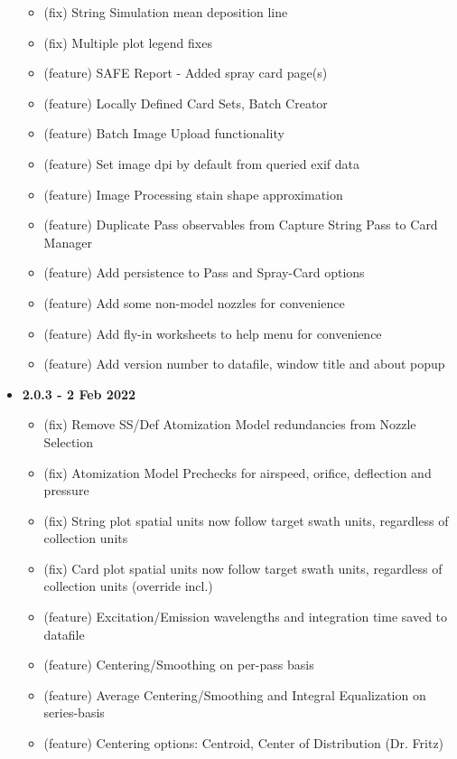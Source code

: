 \documentclass[10pt,letterpaper,titlepage]{article}
\begin{document}
\begin{itemize}
\begin{itemize}
            \item (fix) String Simulation mean deposition line
            \item (fix) Multiple plot legend fixes
            \item (feature) SAFE Report - Added spray card page(s)
            \item (feature) Locally Defined Card Sets, Batch Creator
            \item (feature) Batch Image Upload functionality
            \item (feature) Set image dpi by default from queried exif data
            \item (feature) Image Processing stain shape approximation
            \item (feature) Duplicate Pass observables from Capture String Pass to Card Manager
            \item (feature) Add persistence to Pass and Spray-Card options
            \item (feature) Add some non-model nozzles for convenience
            \item (feature) Add fly-in worksheets to help menu for convenience
            \item (feature) Add version number to datafile, window title and about popup
        \end{itemize}
        \item \textbf{2.0.3 - 2 Feb 2022}
        \begin{itemize}
            \item (fix) Remove SS/Def Atomization Model redundancies from Nozzle Selection
            \item (fix) Atomization Model Prechecks for airspeed, orifice, deflection and pressure
            \item (fix) String plot spatial units now follow target swath units, regardless of collection units
            \item (fix) Card plot spatial units now follow target swath units, regardless of collection units (override incl.)
            \item (feature) Excitation/Emission wavelengths and integration time saved to datafile
            \item (feature) Centering/Smoothing on per-pass basis
            \item (feature) Average Centering/Smoothing and Integral Equalization on series-basis
            \item (feature) Centering options: Centroid, Center of Distribution (Dr. Fritz)

\end{itemize}
\end{itemize}
\end{document}
